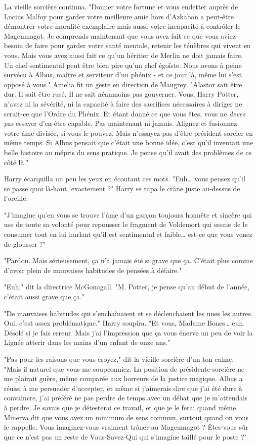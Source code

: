 La vieille sorcière continua. "Donner votre fortune et vous endetter auprès de Lucius Malfoy pour garder votre meilleure amie hors d'Azkaban a peut-être démontrer votre moralité exemplaire mais aussi votre incapacité à contrôler le Magenmagot. Je comprends maintenant que vous avez fait ce que vous aviez besoin de faire pour garder votre santé mentale, retenir les ténèbres qui vivent en vous. Mais vous avez aussi fait ce qu'un héritier de Merlin ne doit jamais faire. Un chef sentimental peut être bien pire qu'un chef égoïste. Nous avons à peine survécu à Albus, maître et serviteur d'un phénix - et ce jour là, même lui s'est opposé à vous." Amelia fit un geste en direction de Maugrey. "Alastor sait être dur. Il sait être rusé. Il ne sait néanmoins pas gouverner. Vous, Harry Potter, n'avez ni la sévérité, ni la capacité à faire des sacrifices nécessaires à diriger ne serait-ce que l'Ordre du Phénix. Et étant donné ce que vous êtes, vous ne \emph{devez pas}  essayer d'en être capable. Pas maintenant ni jamais. Alignez et fusionnez votre âme divisée, si vous le pouvez. Mais n'essayez pas d'être président-sorcier en même temps. Si Albus pensait que c'était une bonne idée, c'est qu'il inventait une belle histoire au mépris du sens pratique. Je pense qu'il avait des problèmes de ce côté là."

Harry écarquilla un peu les yeux en écoutant ces mots. "Euh… vous pensez qu'il se passe quoi là-haut, exactement ?" Harry se tapa le crâne juste au-dessus de l'oreille.

"J'imagine qu'en vous se trouve l'âme d'un garçon toujours honnête et sincère qui use de toute sa volonté pour repousser le fragment de Voldemort qui essaie de le consumer tout en lui hurlant qu'il est sentimental et faible… est-ce que vous venez de glousser ?"

"Pardon. Mais sérieusement, ça n'a jamais été si grave que ça. C'était plus comme d'avoir plein de mauvaises habitudes de pensées à défaire."

"Euh," dit la directrice McGonagall. "M. Potter, je pense qu'au début de l'année, c'était aussi grave que ça."

"De mauvaises habitudes qui s'enchaînaient et se déclenchaient les unes les autres. Oui, c'est assez problématique." Harry soupira. "Et vous, Madame Bones… euh. Désolé si je fais erreur. Mais j'ai l'impression que ça vous énerve un peu de voir la Lignée atterir dans les mains d'un enfant de onze ans."

"Pas pour les raisons que vous croyez," dit la vieille sorcière d'un ton calme. "Mais il naturel que vous me soupconniez. La position de présidente-sorcière ne me plairait guère, même comparée aux horreurs de la justice magique. Albus a réussi à me persuader d'accepter, et même si j'aimerais dire que j'ai été dure à convaincre, j'ai préféré ne pas perdre de temps avec un débat que je m'attendais à perdre. Je savais que je détesterai ce travail, et que je le ferai quand même. Minerva dit que vous avez un minimum de sens commun, surtout quand on vous le rappelle. Vous imaginez-vous vraiment trôner au Magenmagot ? Êtes-vous sûr que ce n'est pas un reste de Vous-Savez-Qui qui s'imagine taillé pour le poste ?"

